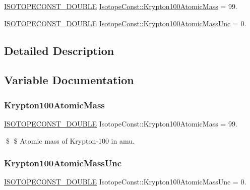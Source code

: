 \begin{DoxyCompactItemize}
\item 
\mbox{\hyperlink{group___isotope_const-_macros_ga8f45a7272ce02c0b4c65c44636ed719a}{I\+S\+O\+T\+O\+P\+E\+C\+O\+N\+S\+T\+\_\+\+D\+O\+U\+B\+LE}} \mbox{\hyperlink{group___isotope_const-_krypton-_kr100_gac9f741c47a7748f1a5eb8c473c47df0f}{Isotope\+Const\+::\+Krypton100\+Atomic\+Mass}} = 99.
\item 
\mbox{\hyperlink{group___isotope_const-_macros_ga8f45a7272ce02c0b4c65c44636ed719a}{I\+S\+O\+T\+O\+P\+E\+C\+O\+N\+S\+T\+\_\+\+D\+O\+U\+B\+LE}} \mbox{\hyperlink{group___isotope_const-_krypton-_kr100_gad18d62628f4d6cf4fdaf7b81922dfb5d}{Isotope\+Const\+::\+Krypton100\+Atomic\+Mass\+Unc}} = 0.
\end{DoxyCompactItemize}


\subsection{Detailed Description}


\subsection{Variable Documentation}
\mbox{\label{group___isotope_const-_krypton-_kr100_gac9f741c47a7748f1a5eb8c473c47df0f}} 
\subsubsection{\texorpdfstring{Krypton100\+Atomic\+Mass}{Krypton100AtomicMass}}
{\footnotesize\ttfamily \mbox{\hyperlink{group___isotope_const-_macros_ga8f45a7272ce02c0b4c65c44636ed719a}{I\+S\+O\+T\+O\+P\+E\+C\+O\+N\+S\+T\+\_\+\+D\+O\+U\+B\+LE}} Isotope\+Const\+::\+Krypton100\+Atomic\+Mass = 99.}

\$ \$ Atomic mass of Krypton-\/100 in amu. \mbox{\label{group___isotope_const-_krypton-_kr100_gad18d62628f4d6cf4fdaf7b81922dfb5d}} 
\subsubsection{\texorpdfstring{Krypton100\+Atomic\+Mass\+Unc}{Krypton100AtomicMassUnc}}
{\footnotesize\ttfamily \mbox{\hyperlink{group___isotope_const-_macros_ga8f45a7272ce02c0b4c65c44636ed719a}{I\+S\+O\+T\+O\+P\+E\+C\+O\+N\+S\+T\+\_\+\+D\+O\+U\+B\+LE}} Isotope\+Const\+::\+Krypton100\+Atomic\+Mass\+Unc = 0.}

